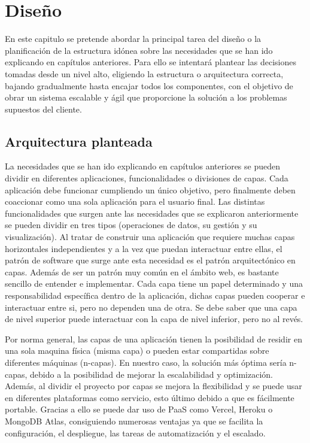 \chapter{Diseño}\label{ch:diseño}
En este capitulo se pretende abordar la principal tarea del diseño o la planificación de la estructura idónea sobre las necesidades que se han ido explicando en capítulos anteriores. Para ello se intentará plantear las decisiones tomadas desde un nivel alto, eligiendo la estructura o arquitectura correcta, bajando gradualmente hasta encajar todos los componentes, con el objetivo de obrar un sistema escalable y ágil que proporcione la solución a los problemas supuestos del cliente.

\section{Arquitectura planteada}
La necesidades que se han ido explicando en capítulos anteriores se pueden dividir en diferentes aplicaciones, funcionalidades o divisiones de capas. Cada aplicación debe funcionar cumpliendo un único objetivo, pero finalmente deben coaccionar como una sola aplicación para el usuario final. Las distintas funcionalidades que surgen ante las necesidades que se explicaron anteriormente se pueden dividir en tres tipos (operaciones de datos, su gestión y su visualización). Al tratar de construir una aplicación que requiere muchas capas horizontales independientes y a la vez que puedan interactuar entre ellas, el patrón de software que surge ante esta necesidad es el patrón arquitectónico en capas. Además de ser un patrón muy común en el ámbito web, es bastante sencillo de entender e implementar. Cada capa tiene un papel determinado y una responsabilidad específica dentro de la aplicación, dichas capas pueden cooperar e interactuar entre si, pero no dependen una de otra. Se debe saber que una capa de nivel superior puede interactuar con la capa de nivel inferior, pero no al revés. \cite{aqruitecturaMicrosoft}

\vspace{0.3cm}

Por norma general, las capas de una aplicación tienen la posibilidad de residir en una sola maquina física (misma capa) o pueden estar compartidas sobre diferentes máquinas (n-capas). En nuestro caso, la solución más óptima sería n-capas, debido a la posibilidad de mejorar la escalabilidad y optimización. Además, al dividir el proyecto por capas se mejora la flexibilidad y se puede usar en diferentes plataformas como servicio, esto último debido a que es fácilmente portable. Gracias a ello se puede dar uso de \ac{PaaS} como Vercel, Heroku o MongoDB Atlas, consiguiendo numerosas ventajas ya que se facilita la configuración, el despliegue, las tareas de automatización y el escalado.

